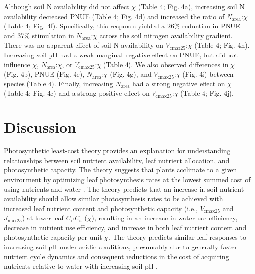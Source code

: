     Although soil N availability did not affect $\chi$ (Table 4; Fig. 4a), increasing soil N availability decreased PNUE (Table 4; Fig. 4d) and increased the ratio of $N_\mathrm{area}$:$\chi$ (Table 4; Fig. 4f). Specifically, this response yielded a 26\% reduction in PNUE and 37\% stimulation in $N_\mathrm{area}$:$\chi$ across the soil nitrogen availability gradient. There was no apparent effect of soil N availability on $V_\mathrm{cmax25}$:$\chi$ (Table 4; Fig. 4h). Increasing soil pH had a weak marginal negative effect on PNUE, but did not influence $\chi$, $N_\mathrm{area}$:$\chi$, or $V_\mathrm{cmax25}$:$\chi$ (Table 4). We also observed differences in $\chi$ (Fig. 4b), PNUE (Fig. 4e), $N_\mathrm{area}$:$\chi$ (Fig. 4g), and $V_\mathrm{cmax25}$:$\chi$ (Fig. 4i) between species (Table 4). Finally, increasing $N_\mathrm{area}$ had a strong negative effect on $\chi$ (Table 4; Fig. 4c) and a strong positive effect on $V_\mathrm{cmax25}$:$\chi$ (Table 4; Fig. 4j).
    \clearpage

    \clearpage

    \clearpage

    \section{Discussion}

    Photosynthetic least-cost theory provides an explanation for understanding relationships between soil nutrient availability, leaf nutrient allocation, and photosynthetic capacity. The theory suggests that plants acclimate to a given environment by optimizing leaf photosynthesis rates at the lowest summed cost of using nutrients and water . The theory predicts that an increase in soil nutrient availability should allow similar photosynthesis rates to be achieved with increased leaf nutrient content and photosynthetic capacity (i.e., $V_\mathrm{cmax25}$ and $J_\mathrm{max25}$) at lower leaf $C_\mathrm{i}$:$C_\mathrm{a}$ ($\chi$), resulting in an increase in water use efficiency, decrease in nutrient use efficiency, and increase in both leaf nutrient content and photosynthetic capacity per unit $\chi$. The theory predicts similar leaf responses to increasing soil pH under acidic conditions, presumably due to generally faster nutrient cycle dynamics and consequent reductions in the cost of acquiring nutrients relative to water with increasing soil pH .
    
